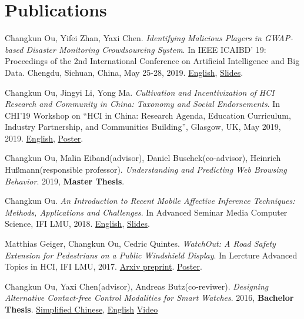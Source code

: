 \section{\textbf{Publications}}
 \resumeSubHeadingListStart
    \item{
        Changkun Ou, Yifei Zhan, Yaxi Chen.
        \emph{Identifying Malicious Players in GWAP-based Disaster Monitoring Crowdsourcing System}. 
        In IEEE ICAIBD' 19: Proceedings of the 2nd International Conference on Artificial Intelligence and Big Data. Chengdu, Sichuan, China, May 25-28, 2019.
        \href{https://github.com/changkun/papers/blob/master/papers/ou2019gwap.pdf}{English},
        \href{https://github.com/changkun/papers/blob/master/papers/ou2019gwap-slides.pdf}{Slides}.
    }
    \item{
        Changkun Ou, Jingyi Li, Yong Ma.
        \emph{Cultivation and Incentivization of HCI Research and Community in China: Taxonomy and Social Endorsements}. 
        In CHI'19 Workshop on ``HCI in China: Research Agenda, Education Curriculum, Industry Partnership, and Communities Building'', Glasgow, UK, May 2019, 2019.
        \href{https://github.com/changkun/papers/blob/master/papers/ou2019chi-paper.pdf}{English},
        \href{https://github.com/changkun/papers/blob/master/papers/ou2019chi-poster.pdf}{Poster}.
    }
    \item{
        Changkun Ou, Malin Eiband(advisor), Daniel Buschek(co-advisor), Heinrich Hußmann(responsible professor).
        \emph{Understanding and Predicting Web Browsing Behavior}. 
        2019, \textbf{Master Thesis}.
    }
    \item{
        Changkun Ou.
        \emph{An Introduction to Recent Mobile Affective Inference Techniques: Methods, Applications and Challenges}.
        In Advanced Seminar Media Computer Science, IFI LMU, 2018. 
        \href{https://github.com/changkun/papers/blob/master/papers/ou2018hs-paper.pdf}{English}, 
        \href{hhttps://github.com/changkun/papers/blob/master/papers/ou2018hs-slides.pdf}{Slides}.
    }
    \item{
        Matthias Geiger, Changkun Ou, Cedric Quintes.
        \emph{WatchOut: A Road Safety Extension for Pedestrians on a Public Windshield Display}.
        In Lercture Advanced Topics in HCI, IFI LMU, 2017. 
        \href{https://arxiv.org/abs/1905.05390}{Arxiv preprint}. 
        \href{https://github.com/changkun/papers/blob/master/papers/ou2017ath-poster.pdf}{Poster}.
    }
    \item{
        Changkun Ou, Yaxi Chen(advisor), Andreas Butz(co-reviwer).
        \emph{Designing Alternative Contact-free Control Modalities for Smart Watches}. 
        2016, \textbf{Bachelor Thesis}. \href{https://github.com/changkun/papers/blob/master/papers/ou2016bachelor-cn.pdf}{Simplified Chinese}, 
        \href{https://github.com/changkun/papers/blob/master/papers/ou2016bachelor-en.pdf}{English} \href{https://www.youtube.com/watch?v=C2-5z7pIv98}{Video}
    }
